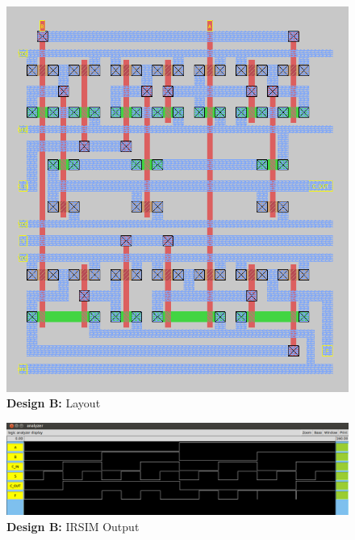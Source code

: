 \documentclass{article}
\begin{document}
\begin{figure}[H]
    \centering
    \includegraphics[width=\linewidth]{../part_3/max/max_layout.png}
    \caption{\textbf{Design B:} Layout}
\end{figure}

\newpage


\begin{figure}[H]
    \centering
    \includegraphics[width=\linewidth]{../part_3/max/max_irsim_glitch.png}
    \caption{\textbf{Design B:} IRSIM Output}
\end{figure}


\end{document}
